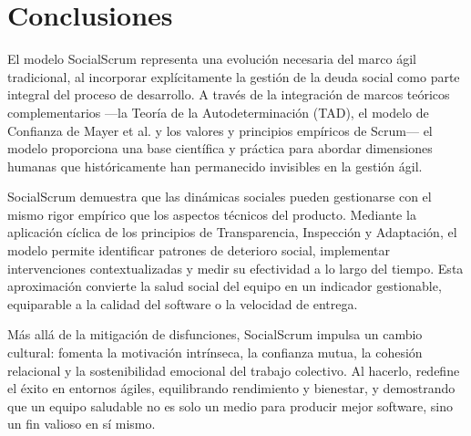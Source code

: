 \section{Conclusiones}

El modelo SocialScrum representa una evolución necesaria del marco ágil tradicional, al incorporar explícitamente la gestión de la deuda social como parte integral del proceso de desarrollo.
A través de la integración de marcos teóricos complementarios —la Teoría de la Autodeterminación (TAD), el modelo de Confianza de Mayer et al. y los valores y principios empíricos de Scrum— el modelo proporciona una base científica y práctica para abordar dimensiones humanas que históricamente han permanecido invisibles en la gestión ágil.

SocialScrum demuestra que las dinámicas sociales pueden gestionarse con el mismo rigor empírico que los aspectos técnicos del producto.
Mediante la aplicación cíclica de los principios de Transparencia, Inspección y Adaptación, el modelo permite identificar patrones de deterioro social, implementar intervenciones contextualizadas y medir su efectividad a lo largo del tiempo.
Esta aproximación convierte la salud social del equipo en un indicador gestionable, equiparable a la calidad del software o la velocidad de entrega.

Más allá de la mitigación de disfunciones, SocialScrum impulsa un cambio cultural: fomenta la motivación intrínseca, la confianza mutua, la cohesión relacional y la sostenibilidad emocional del trabajo colectivo.
Al hacerlo, redefine el éxito en entornos ágiles, equilibrando rendimiento y bienestar, y demostrando que un equipo saludable no es solo un medio para producir mejor software, sino un fin valioso en sí mismo.

\printglossary[type=\acronymtype, title={Acrónimos}]
\printglossary[style=altlist,title={Glosario}]
